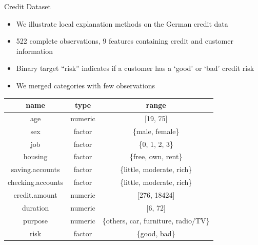 \documentclass[11pt,compress,t,notes=noshow, aspectratio=169, xcolor=table]{beamer}
\begin{document}

\begin{frame}{Credit Dataset}

	\begin{itemize}
		\item We illustrate local explanation methods on the German credit data 
		\item 522 complete observations, 9 features containing credit and customer information
		\item Binary target ``risk'' indicates if a customer has a `good' or `bad' credit risk
		\item We merged categories with few observations 
	\end{itemize}
		\begin{center}
			\footnotesize
			\begin{tabular}{ccc}
				\toprule
				name & type & range\\
				\midrule
				age & numeric & [19, 75]\\
				sex & factor & \{male, female\}\\
				job & factor & \{0, 1, 2, 3\}\\
				housing & factor & \{free, own, rent\}\\
				saving.accounts & factor & \{little, moderate, rich\}\\
				checking.accounts & factor & \{little, moderate, rich\}\\
				credit.amount & numeric & [276, 18424]\\
				duration & numeric &  [6, 72]\\
				purpose & numeric &  \{others, car, furniture, radio/TV\}\\
				risk & factor & \{good, bad\}\\
				\bottomrule
			\end{tabular}
		\end{center}
\end{frame}

\endlecture
\end{document}
